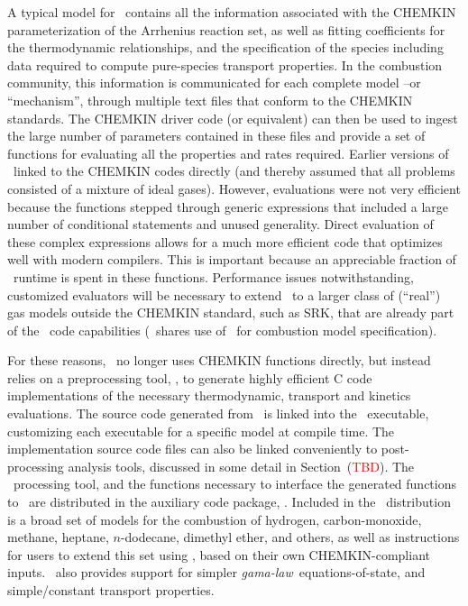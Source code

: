 A typical model for \pelelm\ contains all the information associated with the CHEMKIN parameterization of the Arrhenius reaction set, as well as fitting coefficients for the thermodynamic relationships, and the specification of the species including data required to compute pure-species transport properties. In the combustion community, this information is communicated for each complete model --or ``mechanism'', through multiple text files that conform to the CHEMKIN standards. The CHEMKIN driver code (or equivalent) can then be used to ingest the large number of parameters contained in these files and provide a set of functions for evaluating all the properties and rates required.  Earlier versions of \pelelm\ linked to the CHEMKIN codes directly (and thereby assumed that all problems consisted of a mixture of ideal gases).  However, evaluations were not very efficient because the functions stepped through generic expressions that included a large number of conditional statements and unused generality.  Direct evaluation of these complex expressions allows for a much more efficient code that optimizes well with modern compilers. This is important because an appreciable fraction of \pelelm\ runtime is spent in these functions.  Performance issues notwithstanding, customized evaluators will be necessary to extend \pelelm\ to a larger class of (``real'') gas models outside the CHEMKIN standard, such as SRK, that are already part of the \pelec\ code capabilities (\pelec\ shares use of \pelephysics\ for combustion model specification).

For these reasons, \pelelm\ no longer uses CHEMKIN functions directly, but instead relies on a preprocessing tool, \fuego, to generate highly efficient C code implementations of the necessary thermodynamic, transport and kinetics evaluations.  The source code generated from \fuego\ is linked into the \pelelm\ executable, customizing each executable for a specific model at compile time.  The implementation source code files can also be linked conveniently to post-processing analysis tools, discussed in some detail in Section~(\textcolor{red}{TBD}). The \fuego\ processing tool, and the functions necessary to interface the generated functions to \pelelm\ are distributed in the auxiliary code package, \pelephysics.  Included in the \pelephysics\ distribution is a broad set of models for the combustion of hydrogen, carbon-monoxide, methane, heptane, $n$-dodecane, dimethyl ether, and others, as well as instructions for users to extend this set using \fuego, based on their own CHEMKIN-compliant inputs. \pelephysics\ also provides support for simpler \textit{gama-law}\ equations-of-state, and simple/constant transport properties.

